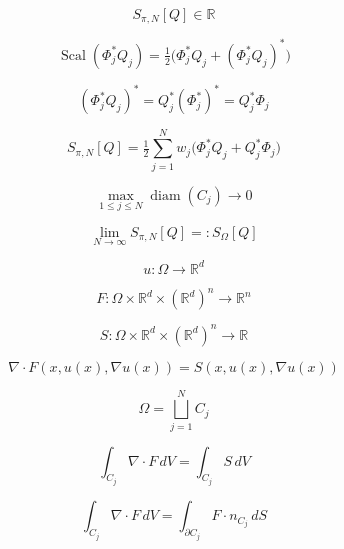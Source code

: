 \documentclass[12pt]{article}
\begin{document}
\begin{equation}
S_{\pi,N}[Q]\in\mathbb{R}
\end{equation}

\begin{equation}
\operatorname{Scal}(\Phi_j^{*}Q_j)=\tfrac{1}{2}\big(\Phi_j^{*}Q_j+(\Phi_j^{*}Q_j)^{*}\big)
\end{equation}

\begin{equation}
(\Phi_j^{*}Q_j)^{*}=Q_j^{*}(\Phi_j^{*})^{*}=Q_j^{*}\Phi_j
\end{equation}

\begin{equation}
S_{\pi,N}[Q]=\tfrac{1}{2}\sum_{j=1}^N w_j\big(\Phi_j^{*}Q_j+Q_j^{*}\Phi_j\big)
\end{equation}

\begin{equation}
\max_{1\le j\le N}\operatorname{diam}(C_j)\to 0
\end{equation}

\begin{equation}
\lim_{N\to\infty} S_{\pi,N}[Q]=:S_\Omega[Q]
\end{equation}

\begin{equation}
u:\Omega\to\mathbb{R}^d
\end{equation}

\begin{equation}
F:\Omega\times\mathbb{R}^d\times(\mathbb{R}^d)^n\to\mathbb{R}^n
\end{equation}

\begin{equation}
S:\Omega\times\mathbb{R}^d\times(\mathbb{R}^d)^n\to\mathbb{R}
\end{equation}

\begin{equation}
\nabla\cdot F(x,u(x),\nabla u(x))=S(x,u(x),\nabla u(x))
\end{equation}

\begin{equation}
\Omega=\bigsqcup_{j=1}^N C_j
\end{equation}

\begin{equation}
\int_{C_j}\nabla\cdot F\,dV=\int_{C_j}S\,dV
\end{equation}

\begin{equation}
\int_{C_j}\nabla\cdot F\,dV=\int_{\partial C_j}F\cdot n_{C_j}\,dS
\end{equation}
\end{document}
